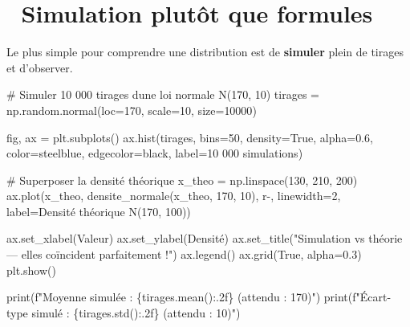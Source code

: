 \documentclass[
  french,
  11pt,
  a4paper,
]{scrbook}
\newenvironment{Shaded}{}{}
\newcommand{\BuiltInTok}[1]{\textcolor[rgb]{0.84,0.23,0.29}{#1}}
\newcommand{\CommentTok}[1]{\textcolor[rgb]{0.42,0.45,0.49}{#1}}
\newcommand{\DecValTok}[1]{\textcolor[rgb]{0.00,0.36,0.77}{#1}}
\newcommand{\FloatTok}[1]{\textcolor[rgb]{0.00,0.36,0.77}{#1}}
\newcommand{\NormalTok}[1]{\textcolor[rgb]{0.14,0.16,0.18}{#1}}
\newcommand{\OperatorTok}[1]{\textcolor[rgb]{0.14,0.16,0.18}{#1}}
\newcommand{\SpecialCharTok}[1]{\textcolor[rgb]{0.00,0.36,0.77}{#1}}
\newcommand{\SpecialStringTok}[1]{\textcolor[rgb]{0.01,0.18,0.38}{#1}}
\newcommand{\StringTok}[1]{\textcolor[rgb]{0.01,0.18,0.38}{#1}}
\newcommand{\VariableTok}[1]{\textcolor[rgb]{0.89,0.38,0.04}{#1}}
\begin{document}
\section{🎲 Simulation plutôt que
formules}\label{simulation-plutuxf4t-que-formules}

Le plus simple pour comprendre une distribution est de \textbf{simuler}
plein de tirages et d'observer.

\begin{Shaded}
\begin{Highlighting}[]
\CommentTok{\# Simuler 10 000 tirages d\textquotesingle{}une loi normale N(170, 10)}
\NormalTok{tirages }\OperatorTok{=}\NormalTok{ np.random.normal(loc}\OperatorTok{=}\DecValTok{170}\NormalTok{, scale}\OperatorTok{=}\DecValTok{10}\NormalTok{, size}\OperatorTok{=}\DecValTok{10000}\NormalTok{)}

\NormalTok{fig, ax }\OperatorTok{=}\NormalTok{ plt.subplots()}
\NormalTok{ax.hist(tirages, bins}\OperatorTok{=}\DecValTok{50}\NormalTok{, density}\OperatorTok{=}\VariableTok{True}\NormalTok{, alpha}\OperatorTok{=}\FloatTok{0.6}\NormalTok{, color}\OperatorTok{=}\StringTok{\textquotesingle{}steelblue\textquotesingle{}}\NormalTok{, }
\NormalTok{        edgecolor}\OperatorTok{=}\StringTok{\textquotesingle{}black\textquotesingle{}}\NormalTok{, label}\OperatorTok{=}\StringTok{\textquotesingle{}10 000 simulations\textquotesingle{}}\NormalTok{)}

\CommentTok{\# Superposer la densité théorique}
\NormalTok{x\_theo }\OperatorTok{=}\NormalTok{ np.linspace(}\DecValTok{130}\NormalTok{, }\DecValTok{210}\NormalTok{, }\DecValTok{200}\NormalTok{)}
\NormalTok{ax.plot(x\_theo, densite\_normale(x\_theo, }\DecValTok{170}\NormalTok{, }\DecValTok{10}\NormalTok{), }\StringTok{\textquotesingle{}r{-}\textquotesingle{}}\NormalTok{, linewidth}\OperatorTok{=}\DecValTok{2}\NormalTok{, }
\NormalTok{        label}\OperatorTok{=}\StringTok{\textquotesingle{}Densité théorique N(170, 100)\textquotesingle{}}\NormalTok{)}

\NormalTok{ax.set\_xlabel(}\StringTok{\textquotesingle{}Valeur\textquotesingle{}}\NormalTok{)}
\NormalTok{ax.set\_ylabel(}\StringTok{\textquotesingle{}Densité\textquotesingle{}}\NormalTok{)}
\NormalTok{ax.set\_title(}\StringTok{"Simulation vs théorie — elles coïncident parfaitement !"}\NormalTok{)}
\NormalTok{ax.legend()}
\NormalTok{ax.grid(}\VariableTok{True}\NormalTok{, alpha}\OperatorTok{=}\FloatTok{0.3}\NormalTok{)}
\NormalTok{plt.show()}

\BuiltInTok{print}\NormalTok{(}\SpecialStringTok{f"Moyenne simulée    : }\SpecialCharTok{\{}\NormalTok{tirages}\SpecialCharTok{.}\NormalTok{mean()}\SpecialCharTok{:.2f\}}\SpecialStringTok{  (attendu : 170)"}\NormalTok{)}
\BuiltInTok{print}\NormalTok{(}\SpecialStringTok{f"Écart{-}type simulé  : }\SpecialCharTok{\{}\NormalTok{tirages}\SpecialCharTok{.}\NormalTok{std()}\SpecialCharTok{:.2f\}}\SpecialStringTok{   (attendu : 10)"}\NormalTok{)}
\end{Highlighting}
\end{Shaded}
\end{document}
